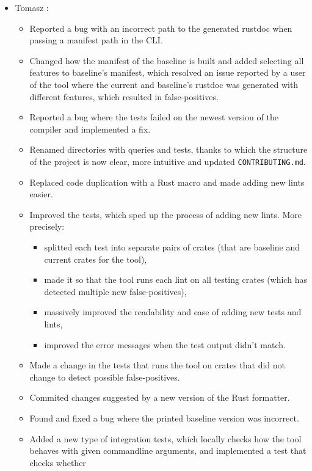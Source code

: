 \documentclass[licencjacka,en]{pracamgr}
\begin{document}
\begin{itemize}
	\item Tomasz \cite{responsibilities-tomasz}:
		\begin{itemize}
			\item Reported a bug with an incorrect path to the generated rustdoc when passing
				a manifest path in the CLI.
			\item Changed how the manifest of the baseline is built and added selecting all
				features to baseline's manifest, which resolved an issue reported by a user of
				the tool where the current and baseline's rustdoc was generated with different
				features, which resulted in false-positives.
			\item Reported a bug where the tests failed on the newest version of the compiler
				and implemented a fix.
			\item Renamed directories with queries and tests, thanks to which the structure of
				the project is now clear, more intuitive and updated \texttt{CONTRIBUTING.md}.
			\item Replaced code duplication with a Rust macro and made adding new lints easier.
			\item Improved the tests, which sped up the process of adding new lints.
				More precisely:
				\begin{itemize}
					\item splitted each test into separate pairs of crates (that are baseline
						and current crates for the tool),
					\item made it so that the tool runs each lint on all testing crates
						(which has detected multiple new false-positives),
					\item massively improved the readability and ease of adding new tests and lints,
					\item improved the error messages when the test output didn't match.
				\end{itemize}
			\item Made a change in the tests that runs the tool on crates that did not change
				to detect possible false-positives.
			\item Commited changes suggested by a new version of the Rust formatter.
			\item Found and fixed a bug where the printed baseline version was incorrect.
			\item Added a new type of integration tests, which locally checks how the tool behaves
				with given commandline arguments, and implemented a test that checks whether

\end{itemize}
\end{itemize}
\end{document}
